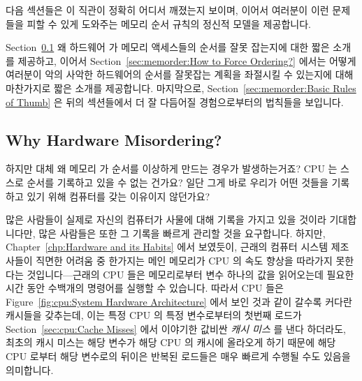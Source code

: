 다음 섹션들은 이 직관이 정확히 어디서 깨졌는지 보이며, 이어서 여러분이 이런
문제들을 피할 수 있게 도와주는 메모리 순서 규칙의 정신적 모델을 제공합니다.

Section~\ref{sec:memorder:Why Hardware Misordering?}
왜 하드웨어 가 메모리 액세스들의 순서를 잘못 잡는지에 대한 짧은 소개를
제공하고, 이어서
Section~\ref{sec:memorder:How to Force Ordering?}
에서는 어떻게 여러분이 악의 사악한 하드웨어의 순서를 잘못잡는 계획을 좌절시킬
수 있는지에 대해 마찬가지로 짧은 소개를 제공합니다.
마지막으로, Section~\ref{sec:memorder:Basic Rules of Thumb} 은 뒤의 섹션들에서
더 잘 다듬어질 경험으로부터의 법칙들을 보입니다.

\subsection{Why Hardware Misordering?}
\label{sec:memorder:Why Hardware Misordering?}

하지만 대체 왜 메모리 가 순서를 이상하게 만드는 경우가 발생하는거죠?
CPU 는 스스로 순서를 기록하고 있을 수 없는 건가요?
일단 그게 바로 우리가 어떤 것들을 기록하고 있기 위해 컴퓨터를 갖는 이유이지
않던가요?

많은 사람들이 실제로 자신의 컴퓨터가 사물에 대해 기록을 가지고 있을 것이라
기대합니다만, 많은 사람들은 또한 그 기록을 빠르게 관리할 것을 요구합니다.
하지만, Chapter~\ref{chp:Hardware and its Habits} 에서 보였듯이, 근래의 컴퓨터
시스템 제조사들이 직면한 어려움 중 한가지는 메인 메모리가 CPU 의 속도 향상을
따라가지 못한다는 것입니다---근래의 CPU 들은 메모리로부터 변수 하나의 값을
읽어오는데 필요한 시간 동안 수백개의 명령어를 실행할 수 있습니다.
따라서 CPU 들은
Figure~\ref{fig:cpu:System Hardware Architecture} 에서 보인 것과 같이
갈수록 커다란 캐시들을 갖추는데, 이는 특정 CPU 의 특정 변수로부터의 첫번째
로드가
Section~\ref{sec:cpu:Cache Misses} 에서 이야기한 값비싼 \emph{캐시 미스} 를
낸다 하더라도, 최초의 캐시 미스는 해당 변수가 해당 CPU 의 캐시에 올라오게 하기
때문에 해당 CPU 로부터 해당 변수로의 뒤이은 반복된 로드들은 매우 빠르게
수행될 수도 있음을 의미합니다.
\iffalse

